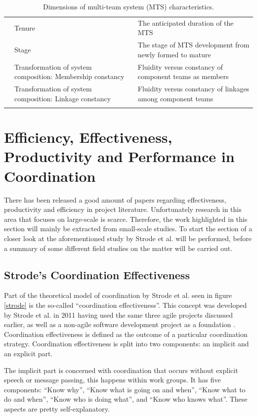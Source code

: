 \begin{center}
\begin{longtable}{ | p{2.5cm} | p{4cm} | p{8cm} | }
	& Tenure & The anticipated duration of the MTS \\ \cline{2-3}
	& Stage & The stage of MTS development from newly formed to mature \\ \cline{2-3}
	& Transformation of system composition: Membership constancy & Fluidity versus constancy of component teams as members \\ \cline{2-3}
	& Transformation of system composition: Linkage constancy & Fluidity versus constancy of linkages among component teams \\ \cline{2-3}
	\hline
\caption{Dimensions of multi-team system (MTS) characteristics.}
\label{domsc}
\end{longtable}
\end{center}

\section{Efficiency, Effectiveness, Productivity and Performance in Coordination}
\label{efficiency}

There has been released a good amount of papers regarding effectiveness, productivity and efficiency in project literature. Unfortunately research in this area that focuses on large-scale is scarce. Therefore, the work highlighted in this section will mainly be extracted from small-scale studies. To start the section of a closer look at the aforementioned study by Strode et al. \cite{Strode2011} will be performed, before a summary of some different field studies on the matter will be carried out.

\subsection{Strode's Coordination Effectiveness}
\label{cordinationeffectiveness}

Part of the theoretical model of coordination by Strode et al. seen in figure \ref{strode} is the so-called ``coordination effectiveness''. This concept was developed by Strode et al. in 2011 having used the same three agile projects discussed earlier, as well as a non-agile software development project as a foundation \cite{Strode2011}. Coordination effectiveness is defined as the outcome of a particular coordination strategy. Coordination effectiveness is split into two components: an implicit and an explicit part.

The implicit part is concerned with coordination that occurs without explicit speech or message passing, this happens within work groups. It has five components: ``Know why'', ``Know what is going on and when'', ``Know what to do and when'', ``Know who is doing what'', and ``Know who knows what''. These aspects are pretty self-explanatory.

